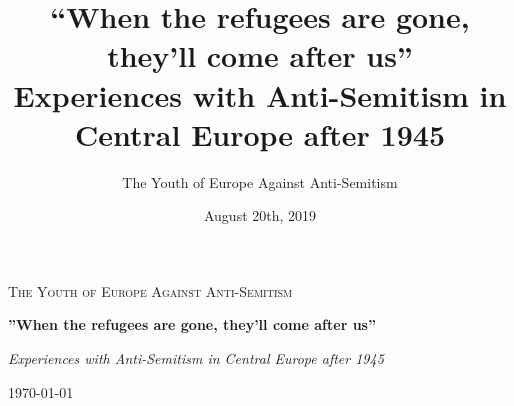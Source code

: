 \documentclass{book}
\title{``When the refugees are gone, they'll come after us''\\ Experiences with Anti-Semitism in Central Europe after 1945}
\author{The Youth of Europe Against Anti-Semitism}
\date{August 20th, 2019}
\begin{document}
	\setlength{\parindent}{0pt}
	\setlength{\parskip}{1em}
\begin{titlepage}
	\centering
	{\scshape\LARGE The Youth of Europe
	Against Anti-Semitism \par}
	\vspace{1cm}
	{\huge\bfseries''When the refugees are gone, they'll come after us'' \par}
	\vspace{2cm}
	{\Large\itshape Experiences with Anti-Semitism in Central Europe after 1945\par}
	\vfill
	{\large\today\par}
\end{titlepage}
\thispagestyle{empty}
\tableofcontents

















 








\nocite{*}
\printbibliography
\end{document}
